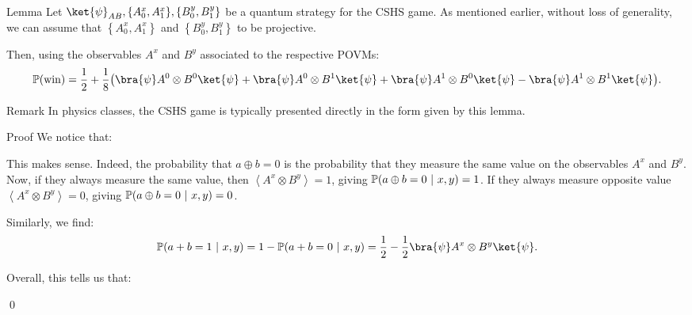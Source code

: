 \documentclass[a4paper]{article}
\begin{document}
\begin{parag}{Lemma}
    Let $\ket{\psi}_{AB}, \left\{A_0^x, A_1^x\right\}, \left\{B_0^y, B_1^y\right\}$ be a quantum strategy for the CSHS game. As mentioned earlier, without loss of generality, we can assume that $\left\{A_0^x, A_1^x\right\}$ and $\left\{B_0^y, B_1^y\right\}$ to be projective. 

    Then, using the observables $A^x$ and $B^y$ associated to the respective POVMs:
    \[\prob\left(\text{win}\right) = \frac{1}{2} + \frac{1}{8}\left(\bra{\psi} A^0 \otimes B^0 \ket{\psi} + \bra{\psi} A^0 \otimes B^1 \ket{\psi} + \bra{\psi} A^1 \otimes B^0 \ket{\psi} - \bra{\psi} A^1 \otimes B^1 \ket{\psi}\right).\]

    \begin{subparag}{Remark}
        In physics classes, the CSHS game is typically presented directly in the form given by this lemma.
    \end{subparag}

    \begin{subparag}{Proof}
        We notice that:

        This makes sense. Indeed, the probability that $a \oplus b = 0$ is the probability that they measure the same value on the observables $A^x$ and $B^y$. Now, if they always measure the same value, then $\left\langle A^x \otimes B^y \right\rangle = 1$, giving $\prob\left(a \oplus b = 0 \suchthat x, y\right) = 1$. If they always measure opposite value $\left\langle A^x \otimes B^y \right\rangle = 0$, giving $\prob\left(a \oplus b = 0 \suchthat x, y\right) = 0$.

        Similarly, we find: 
        \[\prob\left(a + b = 1 \suchthat x, y\right)=  1-  \prob\left(a + b = 0 \suchthat x, y\right) = \frac{1}{2} - \frac{1}{2} \bra{\psi} A^x \otimes B^y \ket{\psi}.\]

        Overall, this tells us that: 

        \qed
    \end{subparag}
\end{parag}
\end{document}
